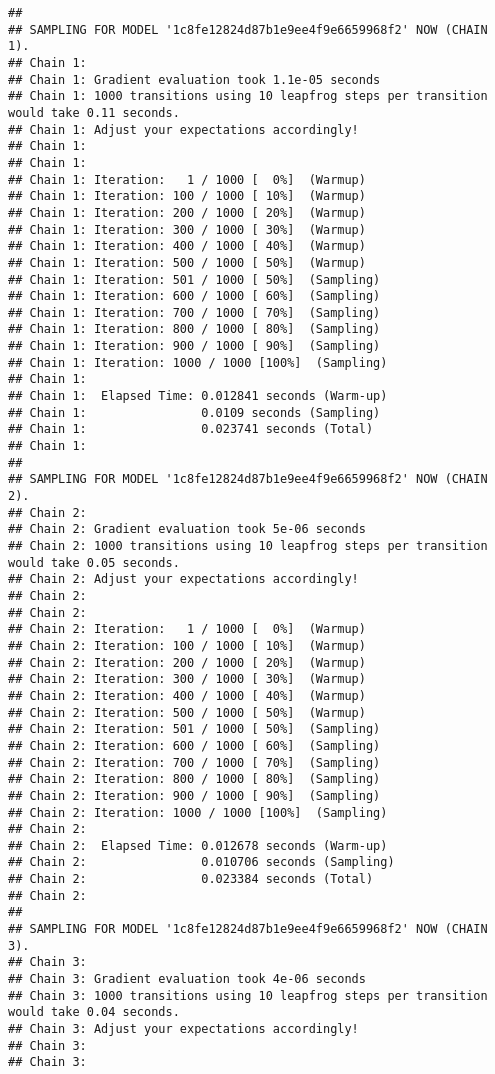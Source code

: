 \documentclass[]{article}
\begin{document}
\begin{verbatim}
## 
## SAMPLING FOR MODEL '1c8fe12824d87b1e9ee4f9e6659968f2' NOW (CHAIN 1).
## Chain 1: 
## Chain 1: Gradient evaluation took 1.1e-05 seconds
## Chain 1: 1000 transitions using 10 leapfrog steps per transition would take 0.11 seconds.
## Chain 1: Adjust your expectations accordingly!
## Chain 1: 
## Chain 1: 
## Chain 1: Iteration:   1 / 1000 [  0%]  (Warmup)
## Chain 1: Iteration: 100 / 1000 [ 10%]  (Warmup)
## Chain 1: Iteration: 200 / 1000 [ 20%]  (Warmup)
## Chain 1: Iteration: 300 / 1000 [ 30%]  (Warmup)
## Chain 1: Iteration: 400 / 1000 [ 40%]  (Warmup)
## Chain 1: Iteration: 500 / 1000 [ 50%]  (Warmup)
## Chain 1: Iteration: 501 / 1000 [ 50%]  (Sampling)
## Chain 1: Iteration: 600 / 1000 [ 60%]  (Sampling)
## Chain 1: Iteration: 700 / 1000 [ 70%]  (Sampling)
## Chain 1: Iteration: 800 / 1000 [ 80%]  (Sampling)
## Chain 1: Iteration: 900 / 1000 [ 90%]  (Sampling)
## Chain 1: Iteration: 1000 / 1000 [100%]  (Sampling)
## Chain 1: 
## Chain 1:  Elapsed Time: 0.012841 seconds (Warm-up)
## Chain 1:                0.0109 seconds (Sampling)
## Chain 1:                0.023741 seconds (Total)
## Chain 1: 
## 
## SAMPLING FOR MODEL '1c8fe12824d87b1e9ee4f9e6659968f2' NOW (CHAIN 2).
## Chain 2: 
## Chain 2: Gradient evaluation took 5e-06 seconds
## Chain 2: 1000 transitions using 10 leapfrog steps per transition would take 0.05 seconds.
## Chain 2: Adjust your expectations accordingly!
## Chain 2: 
## Chain 2: 
## Chain 2: Iteration:   1 / 1000 [  0%]  (Warmup)
## Chain 2: Iteration: 100 / 1000 [ 10%]  (Warmup)
## Chain 2: Iteration: 200 / 1000 [ 20%]  (Warmup)
## Chain 2: Iteration: 300 / 1000 [ 30%]  (Warmup)
## Chain 2: Iteration: 400 / 1000 [ 40%]  (Warmup)
## Chain 2: Iteration: 500 / 1000 [ 50%]  (Warmup)
## Chain 2: Iteration: 501 / 1000 [ 50%]  (Sampling)
## Chain 2: Iteration: 600 / 1000 [ 60%]  (Sampling)
## Chain 2: Iteration: 700 / 1000 [ 70%]  (Sampling)
## Chain 2: Iteration: 800 / 1000 [ 80%]  (Sampling)
## Chain 2: Iteration: 900 / 1000 [ 90%]  (Sampling)
## Chain 2: Iteration: 1000 / 1000 [100%]  (Sampling)
## Chain 2: 
## Chain 2:  Elapsed Time: 0.012678 seconds (Warm-up)
## Chain 2:                0.010706 seconds (Sampling)
## Chain 2:                0.023384 seconds (Total)
## Chain 2: 
## 
## SAMPLING FOR MODEL '1c8fe12824d87b1e9ee4f9e6659968f2' NOW (CHAIN 3).
## Chain 3: 
## Chain 3: Gradient evaluation took 4e-06 seconds
## Chain 3: 1000 transitions using 10 leapfrog steps per transition would take 0.04 seconds.
## Chain 3: Adjust your expectations accordingly!
## Chain 3: 
## Chain 3: 

\end{verbatim}
\end{document}
